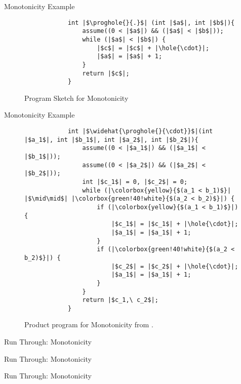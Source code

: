\begin{frame}[fragile]{Monotonicity Example}
    \begin{figure}[t]
        \small
        \begin{verbatim}
            int |$\proghole{}{.}$| (int |$a$|, int |$b$|){
                assume((0 < |$a$|) && (|$a$| < |$b$|));
                while (|$a$| < |$b$|) {
                    |$c$| = |$c$| + |\hole{\cdot}|;
                    |$a$| = |$a$| + 1;
                }
                return |$c$|;
            }
        \end{verbatim}
        \caption{Program Sketch for Monotonicity}
        \label{list:prog:qbsynth}
    \end{figure}
\end{frame}

\begin{frame}[fragile]{Monotonicity Example}
    \begin{figure}[t]
        \begin{verbatim}
            int |$\widehat{\proghole{}{\cdot}}$|(int |$a_1$|, int |$b_1$|, int |$a_2$|, int |$b_2$|){
                assume((0 < |$a_1$|) && (|$a_1$| < |$b_1$|));
                assume((0 < |$a_2$|) && (|$a_2$| < |$b_2$|));
                int |$c_1$| = 0, |$c_2$| = 0;
                while (|\colorbox{yellow}{$(a_1 < b_1)$}| |$\mid\mid$| |\colorbox{green!40!white}{$(a_2 < b_2)$}|) {
                    if (|\colorbox{yellow}{$(a_1 < b_1)$}|) {
                        |$c_1$| = |$c_1$| + |\hole{\cdot}|;
                        |$a_1$| = |$a_1$| + 1;
                    }
                    if (|\colorbox{green!40!white}{$(a_2 < b_2)$}|) {
                        |$c_2$| = |$c_2$| + |\hole{\cdot}|;
                        |$a_1$| = |$a_1$| + 1;
                    }
                }
                return |$c_1,\ c_2$|;
            }
        \end{verbatim}
        \caption{Product program for Monotonicity from .}
        \label{list:pp:qbsynth}
    \end{figure}
\end{frame}

\begin{frame}{Run Through: Monotonicity}

\end{frame}

\begin{frame}{Run Through: Monotonicity}

\end{frame}

\begin{frame}{Run Through: Monotonicity}

\end{frame}